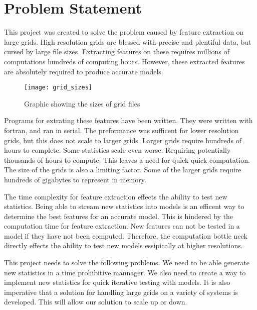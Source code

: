 \section{Problem Statement}
This project was created to solve the problem caused by feature extraction on large grids.
High resolution grids are blessed with precise and plentiful data, but cursed by large file sizes.
Extracting features on these requires millions of computations hundreds of computing hours.
However, these extracted features are absolutely required to produce accurate models.
\begin{figure}[h]
    \centering
    \texttt{[image: grid\_sizes]}
    \caption{Graphic showing the sizes of grid files}
  \end{figure}

\par
Programs for extrating these features have been written. 
They were written with fortran, and ran in serial.
The preformance was sufficent for lower resolution grids, but this does not scale to larger grids.
Larger grids require hundreds of hours to complete.
Some statistics scale even worse.
Requiring potentially thousands of hours to compute. 
This leaves a need for quick quick computation.
The size of the grids is also a limiting factor. 
Some of the larger grids require hundreds of gigabytes to represent in memory.

\par
The time complexity for feature extraction effects the ability to test new statistics.
Being able to stream new statistics into models is an efficent way to determine the best features for an accurate model.
This is hindered by the computation time for feature extraction.
New features can not be tested in a model if they have not been computed.
Therefore, the computation bottle neck directly effects the ability to test new models essipically at higher resolutions.

\par
This project needs to solve the following problems.
We need to be able generate new statistics in a time prohibitive mannager.
We also need to create a way to implement new statistics for quick iterative testing with models.
It is also imperative that a solution for handling large grids on a variety of systems is developed.
This will allow our solution to scale up or down.


